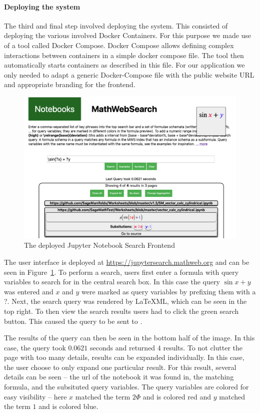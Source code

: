 \paragraph{Deploying the system}

The third and final step involved deploying the system.
This consisted of deploying the various involved Docker Containers. 
For this purpose we made use of a tool called Docker Compose. 
Docker Compose allows defining complex interactions between containers in a simple docker compose file. 
The tool then automatically starts containers as described in this file. 
For our \MWS application we only needed to adapt a generic \MWS Docker-Compose file with the public website URL and appropriate branding for the frontend. 

\begin{figure}[ht]
  \includegraphics[width=\textwidth]{mwsnotebookfront.png}
  \caption{The deployed Jupyter Notebook Search Frontend}\label{fig:mwsnotebookfront}
\end{figure}

The user interface is deployed at \url{https://jupytersearch.mathweb.org} and can be seen in Figure~\ref{fig:mwsnotebookfront}.
To perform a search, users first enter a formula with query variables to search for in the central search box. 
In this case the query $\sin{x} + y$ was entered and $x$ and $y$ were marked as query variables by prefixing them with a ?. 
Next, the search query was rendered by {\LaTeX}ML, which can be seen in the top right. 
To then view the search results users had to click the green search button. 
This caused the query to be sent to \MWS. 

The results of the query can then be seen in the bottom half of the image.
In this case, the query took $0.0621$ seconds and returned $4$ results. 
To not clutter the page with too many details, results can be expanded individually. 
In this case, the user choose to only expand one particular result. 
For this result, several details can be seen -- the url of the notebook it was found in, the matching formula, and the subsituted query variables. 
The query variables are colored for easy visibility -- here $x$ matched the term $2\Phi$ and is colored red and $y$ matched the term $1$ and is colored blue. 

